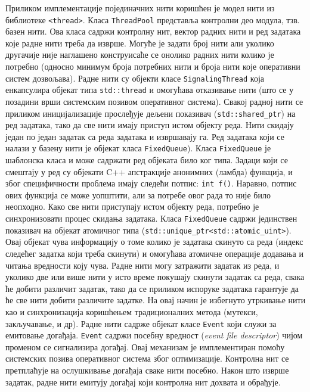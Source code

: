 \documentclass[12pt,oneside]{memoir}
\begin{document}
%

Приликом имплементације појединачних нити коришћен је модел нити из библиотеке \texttt{<thread>}.
Класа \texttt{ThreadPool} представља контролни део модула, тзв. базен нити. Ова класа садржи контролну нит, вектор радних нити и ред задатака које радне нити треба да изврше. Могуће је задати број нити али уколико другачије није наглашено конструисаће се онолико радних нити колико је потребно (односно минимум броја потребних нити и броја нити које оперативни систем дозвољава). Радне нити су објекти класе \texttt{SignalingThread} која енкапсулира објекат типа \texttt{std::thread} и омогућава отказивање нити (што се у позадини врши системским позивом оперативног система). Свакој радној нити се приликом иницијализације прослеђује дељени показивач (\texttt{std::shared\_ptr}) на ред задатака, тако да све нити имају приступ истом објекту реда. Нити скидају један по један задатак са реда задатака и извршавају га. Ред задатака који се налази у базену нити је објекат класа \texttt{FixedQueue}). Класа \texttt{FixedQueue} је шаблонска класа и може садржати ред објеката било ког типа. Задаци који се смештају у ред су објекати C++ апстракције анонимних (ламбда) функција, и због специфичности проблема имају следећи потпис: \texttt{int f()}. Наравно, потпис ових функција се може уопштити, али за потребе овог рада то није било неопходно. Како све нити приступају истом објекту реда, потребно је синхронизовати процес скидања задатака. Класа \texttt{FixedQueue} садржи јединствен показивач на објекат атомичног типа (\texttt{std::unique\_ptr<std::atomic\_uint>}). Овај објекат чува информацију о томе колико је задатака скинуто са реда (индекс следећег задатка који треба скинути) и омогућава атомичне операције додавања и читања вредности коју чува. Радне нити могу затражити задатак из реда, и уколико две или више нити у исто време покушају скинути задатак са реда, свака ће добити различит задатак, тако да се приликом испоруке задатака гарантује да ће све нити добити различите задатке.  На овај начин је избегнуто утркивање нити као и синхронизација коришћењем традиционалних метода (мутекси, закључавање, и др). Радне нити садрже објекат класе \texttt{Event} који служи за емитовање догађаја. \texttt{Event} садржи посебну вредност (\textit{event file descriptor}) чијом променом се сигнализира догађај. Овај механизам је имплементиран помоћу системских позива оперативног система због  оптимизације. Контролна нит се претплаћује на ослушкивање догађаја сваке нити посебно. Након што изврше задатак, радне нити емитују догађај који контролна нит дохвата и обрађује. 
\end{document}
